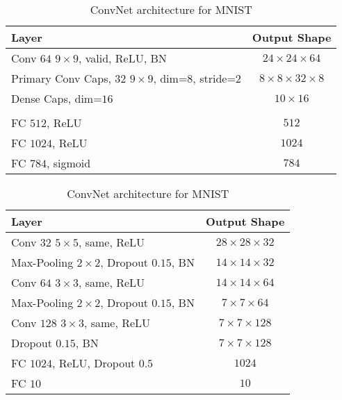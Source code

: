 \begin{table}
	\centering
	
	\begin{tabular}{lc}
		\toprule 
		Layer	&  Output Shape \\ 
		\midrule 
		Conv $64$ $9\times9$, valid, ReLU, BN & $24\times24\times64$ \\ 
		\midrule 
		Primary Conv Caps, $32$ $9\times9$, dim=$8$, stride=2	&  $8\times8\times32\times8$ \\ 
		\midrule 
		Dense Caps, dim=$16$	& $10\times16$ \\ 
		\midrule 
		& \\
		\midrule
		FC $512$, ReLU	& $512$ \\
		\midrule
		FC $1024$, ReLU	& $1024$ \\
		\midrule
		FC $784$, sigmoid	& $784$ \\
		\bottomrule
	\end{tabular} 
	\caption{CapsNet architecture for MNIST}
	\label{tab:capsnet:mnist}

	\vspace{0.75cm}
	
	\begin{tabular}{lc}
		\toprule 
		Layer	&  Output Shape \\ 
		\midrule 
		Conv $32$ $5\times5$, same,	ReLU & $28\times28\times32$ \\ 
		\midrule 
		Max-Pooling $2\times2$, Dropout $0.15$, BN	&  $14\times14\times32$ \\ 
		\midrule 
		Conv $64$ $3\times3$, same, ReLU	& $14\times14\times64$ \\ 
		\midrule 
		Max-Pooling $2\times2$, Dropout $0.15$, BN	& $7\times7\times64$ \\
		\midrule
		Conv $128$ $3\times3$, same, ReLU	& $7\times7\times128$ \\
		\midrule
		Dropout $0.15$, BN	& $7\times7\times128$ \\
		\midrule
		FC $1024$, ReLU, Dropout $0.5$ & $1024$ \\
		\midrule
		FC $10$ & $10$\\
		\bottomrule
	\end{tabular} 
	\caption{ConvNet architecture for MNIST}
	\label{tab:convnet:mnist}
\end{table}


